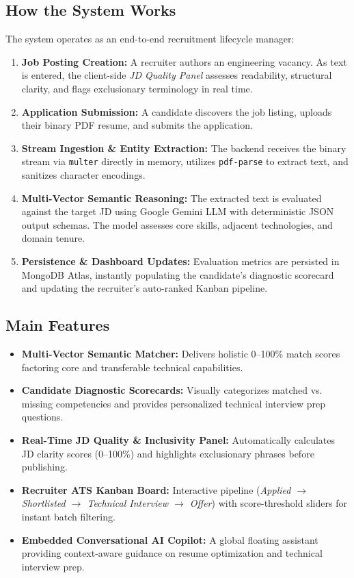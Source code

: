 \documentclass[12pt, a4paper]{article}
\begin{document}
\subsection{How the System Works}
The system operates as an end-to-end recruitment lifecycle manager:
\begin{enumerate}[label=\textbf{\arabic*.}]
    \item \textbf{Job Posting Creation:} A recruiter authors an engineering vacancy. As text is entered, the client-side \textit{JD Quality Panel} assesses readability, structural clarity, and flags exclusionary terminology in real time.
    \item \textbf{Application Submission:} A candidate discovers the job listing, uploads their binary PDF resume, and submits the application.
    \item \textbf{Stream Ingestion \& Entity Extraction:} The backend receives the binary stream via \texttt{multer} directly in memory, utilizes \texttt{pdf-parse} to extract text, and sanitizes character encodings.
    \item \textbf{Multi-Vector Semantic Reasoning:} The extracted text is evaluated against the target JD using Google Gemini LLM with deterministic JSON output schemas. The model assesses core skills, adjacent technologies, and domain tenure.
    \item \textbf{Persistence \& Dashboard Updates:} Evaluation metrics are persisted in MongoDB Atlas, instantly populating the candidate's diagnostic scorecard and updating the recruiter's auto-ranked Kanban pipeline.
\end{enumerate}

\subsection{Main Features}
\begin{itemize}[leftmargin=1.5em, itemsep=2pt]
    \item \textbf{Multi-Vector Semantic Matcher:} Delivers holistic 0--100\% match scores factoring core and transferable technical capabilities.
    \item \textbf{Candidate Diagnostic Scorecards:} Visually categorizes matched vs. missing competencies and provides personalized technical interview prep questions.
    \item \textbf{Real-Time JD Quality \& Inclusivity Panel:} Automatically calculates JD clarity scores (0--100\%) and highlights exclusionary phrases before publishing.
    \item \textbf{Recruiter ATS Kanban Board:} Interactive pipeline (\textit{Applied $\rightarrow$ Shortlisted $\rightarrow$ Technical Interview $\rightarrow$ Offer}) with score-threshold sliders for instant batch filtering.
    \item \textbf{Embedded Conversational AI Copilot:} A global floating assistant providing context-aware guidance on resume optimization and technical interview prep.
\end{itemize}
\end{document}
